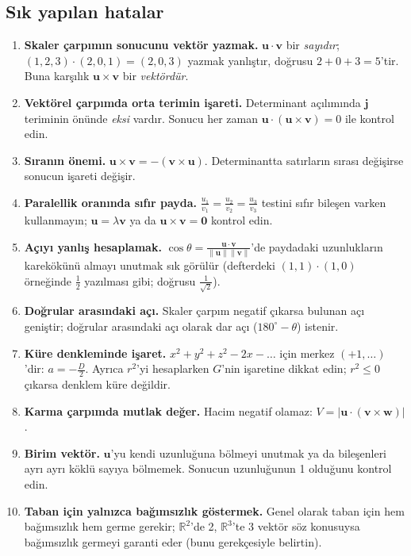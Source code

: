 \subsection{Sık yapılan hatalar}

\begin{dikkat}
\begin{enumerate}
\item \textbf{Skaler çarpımın sonucunu vektör yazmak.} $\mathbf u\cdot\mathbf v$ bir \emph{sayıdır}; $(1,2,3)\cdot(2,0,1)=(2,0,3)$ yazmak yanlıştır, doğrusu $2+0+3=5$'tir. Buna karşılık $\mathbf u\times\mathbf v$ bir \emph{vektördür}.
\item \textbf{Vektörel çarpımda orta terimin işareti.} Determinant açılımında $\mathbf j$ teriminin önünde \emph{eksi} vardır. Sonucu her zaman $\mathbf u\cdot(\mathbf u\times\mathbf v)=0$ ile kontrol edin.
\item \textbf{Sıranın önemi.} $\mathbf u\times\mathbf v=-(\mathbf v\times\mathbf u)$. Determinantta satırların sırası değişirse sonucun işareti değişir.
\item \textbf{Paralellik oranında sıfır payda.} $\frac{u_1}{v_1}=\frac{u_2}{v_2}=\frac{u_3}{v_3}$ testini sıfır bileşen varken kullanmayın; $\mathbf u=\lambda\mathbf v$ ya da $\mathbf u\times\mathbf v=\mathbf 0$ kontrol edin.
\item \textbf{Açıyı yanlış hesaplamak.} $\cos\theta=\frac{\mathbf u\cdot\mathbf v}{\|\mathbf u\|\|\mathbf v\|}$'de paydadaki uzunlukların karekökünü almayı unutmak sık görülür (defterdeki $(1,1)\cdot(1,0)$ örneğinde $\frac12$ yazılması gibi; doğrusu $\frac{1}{\sqrt2}$).
\item \textbf{Doğrular arasındaki açı.} Skaler çarpım negatif çıkarsa bulunan açı geniştir; doğrular arasındaki açı olarak dar açı ($180^\circ-\theta$) istenir.
\item \textbf{Küre denkleminde işaret.} $x^2+y^2+z^2-2x-\ldots$ için merkez $(+1,\ldots)$'dir: $a=-\frac D2$. Ayrıca $r^2$'yi hesaplarken $G$'nin işaretine dikkat edin; $r^2\le0$ çıkarsa denklem küre değildir.
\item \textbf{Karma çarpımda mutlak değer.} Hacim negatif olamaz: $V=|\mathbf u\cdot(\mathbf v\times\mathbf w)|$.
\item \textbf{Birim vektör.} $\mathbf u$'yu kendi uzunluğuna bölmeyi unutmak ya da bileşenleri ayrı ayrı köklü sayıya bölmemek. Sonucun uzunluğunun 1 olduğunu kontrol edin.
\item \textbf{Taban için yalnızca bağımsızlık göstermek.} Genel olarak taban için hem bağımsızlık hem germe gerekir; $\mathbb R^2$'de 2, $\mathbb R^3$'te 3 vektör söz konusuysa bağımsızlık germeyi garanti eder (bunu gerekçesiyle belirtin).
\end{enumerate}
\end{dikkat}

